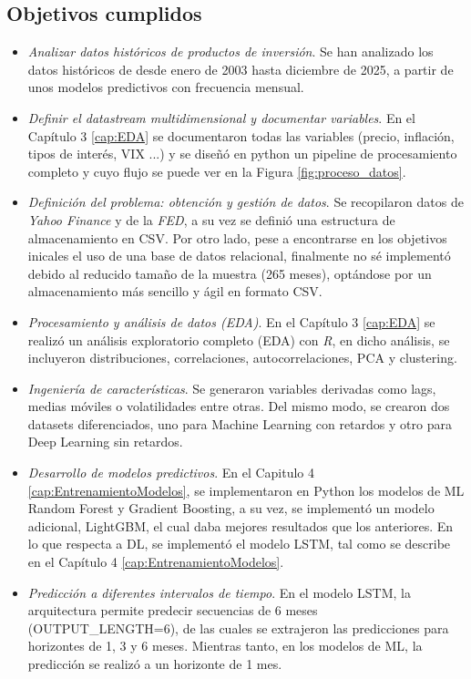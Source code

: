 \subsection{Objetivos cumplidos}
\begin{itemize}
    \item \emph{Analizar datos históricos de productos de inversión}. Se han analizado los datos históricos de  desde enero de 2003 hasta diciembre de 2025, a partir de unos modelos predictivos con frecuencia mensual.
    \item \emph{Definir el datastream multidimensional y documentar variables}. En el Capítulo 3 \ref{cap:EDA} se documentaron todas las variables (precio, inflación, tipos de interés, VIX ...) y se diseñó en python un pipeline de procesamiento completo y cuyo flujo se puede ver en la Figura \ref{fig:proceso_datos}.
    \item \emph{Definición del problema: obtención y gestión de datos}. Se recopilaron datos de \emph{Yahoo Finance} y de la \emph{FED}, a su vez se definió una estructura de almacenamiento en CSV. Por otro lado, pese a encontrarse en los objetivos inicales el uso de una base de datos relacional, finalmente no sé implementó debido al reducido tamaño de la muestra (265 meses), optándose por un almacenamiento más sencillo y ágil en formato CSV.
    \item \emph{Procesamiento y análisis de datos (EDA)}. En el Capítulo 3 \ref{cap:EDA} se realizó un análisis exploratorio completo (EDA) con \emph{R}, en dicho análisis, se incluyeron distribuciones, correlaciones, autocorrelaciones, PCA y clustering.
    \item \emph{Ingeniería de características}. Se generaron variables derivadas como lags, medias móviles o volatilidades entre otras. Del mismo modo, se crearon dos datasets diferenciados, uno para Machine Learning con retardos y otro para Deep Learning sin retardos.
    \item \emph{Desarrollo de modelos predictivos}. En el Capitulo 4 \ref{cap:EntrenamientoModelos}, se implementaron en Python los modelos de ML Random Forest y Gradient Boosting, a su vez, se implementó un modelo adicional, LightGBM, el cual daba mejores resultados que los anteriores. En lo que respecta a DL, se implementó el modelo LSTM, tal como se describe en el Capítulo 4 \ref{cap:EntrenamientoModelos}.
    \item \emph{Predicción a diferentes intervalos de tiempo}. En el modelo LSTM, la arquitectura permite predecir secuencias de 6 meses (OUTPUT\_LENGTH=6), de las cuales se extrajeron las predicciones para horizontes de 1, 3 y 6 meses. Mientras tanto, en los modelos de ML, la predicción se realizó a un horizonte de 1 mes.

\end{itemize}
